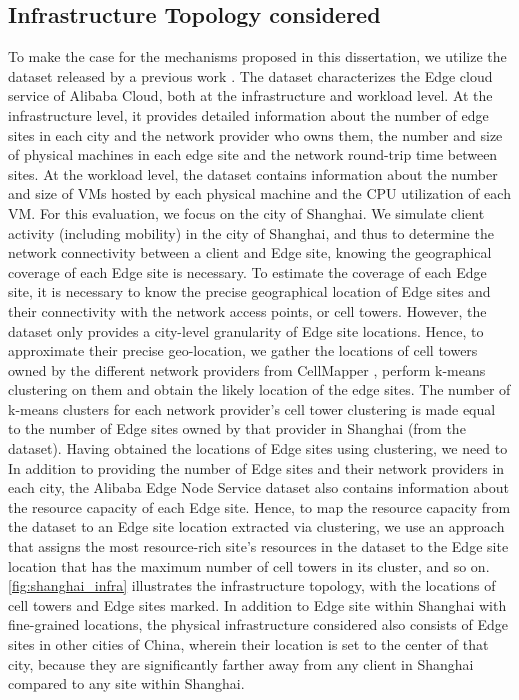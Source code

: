 \subsection{Infrastructure Topology considered}
\label{sec:nep_infra_topology}
\par To make the case for the mechanisms proposed in this dissertation, we utilize the dataset released by a previous work \cite{xu2021cloud}. The dataset characterizes the Edge cloud service of Alibaba Cloud, both at the infrastructure and workload level. At the infrastructure level, it provides detailed information about the number of edge sites in each city and the network provider who owns them, the number and size of physical machines in each edge site and the network round-trip time between sites. At the workload level, the dataset contains information about the number and size of VMs hosted by each physical machine and the CPU utilization of each VM. For this evaluation, we focus on the city of Shanghai. We simulate client activity (including mobility) in the city of Shanghai, and thus to determine the network connectivity between a client and Edge site, knowing the geographical coverage of each Edge site is necessary. To estimate the coverage of each Edge site, it is necessary to know the precise geographical location of Edge sites and their connectivity with the network access points, or cell towers. However, the dataset only provides a city-level granularity of Edge site locations. Hence, to approximate their precise geo-location, we gather the locations of cell towers owned by the different network providers from CellMapper \cite{cellmapper}, perform k-means clustering on them and obtain the likely location of the edge sites. The number of k-means clusters for each network provider's cell tower clustering is made equal to the number of Edge sites owned by that provider in Shanghai (from the dataset). Having obtained the locations of Edge sites using clustering, we need to In addition to providing the number of Edge sites and their network providers in each city, the Alibaba Edge Node Service dataset also contains information about the resource capacity of each Edge site. Hence, to map the resource capacity from the dataset to an Edge site location extracted via clustering, we use an approach that assigns the most resource-rich site's resources in the dataset to the Edge site location that has the maximum number of cell towers in its cluster, and so on. \cref{fig:shanghai_infra} illustrates the infrastructure topology, with the locations of cell towers and Edge sites marked. In addition to Edge site within Shanghai with fine-grained locations, the physical infrastructure considered also consists of Edge sites in other cities of China, wherein their location is set to the center of that city, because they are significantly farther away from any client in Shanghai compared to any site within Shanghai. 

